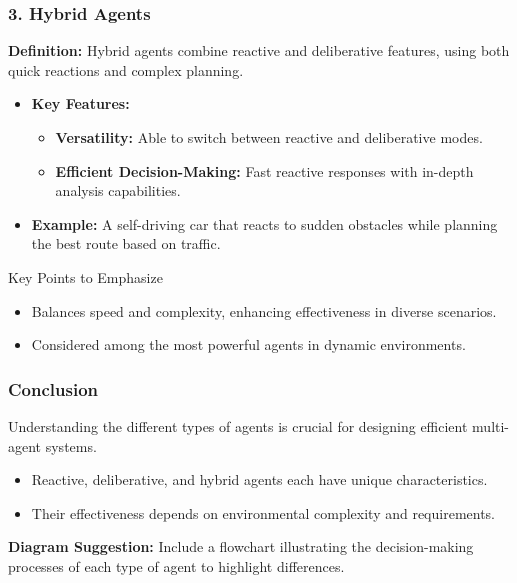 \documentclass[aspectratio=169]{beamer}
\begin{document}
\begin{frame}[fragile]
    \frametitle{3. Hybrid Agents}
    \textbf{Definition:}  
    Hybrid agents combine reactive and deliberative features, using both quick reactions and complex planning.

    \begin{itemize}
        \item \textbf{Key Features:}
        \begin{itemize}
            \item \textbf{Versatility:} Able to switch between reactive and deliberative modes.
            \item \textbf{Efficient Decision-Making:} Fast reactive responses with in-depth analysis capabilities.
        \end{itemize}
        \item \textbf{Example:}
        A self-driving car that reacts to sudden obstacles while planning the best route based on traffic.
    \end{itemize}
    
    \begin{block}{Key Points to Emphasize}
        \begin{itemize}
            \item Balances speed and complexity, enhancing effectiveness in diverse scenarios.
            \item Considered among the most powerful agents in dynamic environments.
        \end{itemize}
    \end{block}
\end{frame}

\begin{frame}[fragile]
    \frametitle{Conclusion}
    Understanding the different types of agents is crucial for designing efficient multi-agent systems. 

    \begin{itemize}
        \item Reactive, deliberative, and hybrid agents each have unique characteristics.
        \item Their effectiveness depends on environmental complexity and requirements.
    \end{itemize}

    \textbf{Diagram Suggestion:} 
    Include a flowchart illustrating the decision-making processes of each type of agent to highlight differences.
\end{frame}
\end{document}
